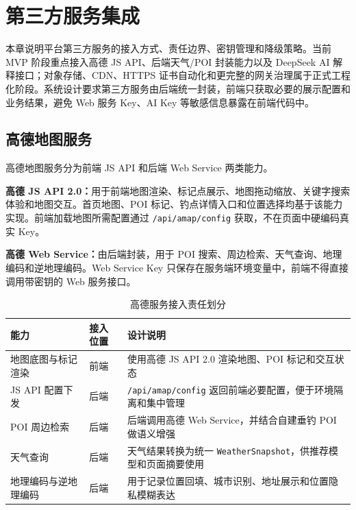 ﻿\section{第三方服务集成}

本章说明平台第三方服务的接入方式、责任边界、密钥管理和降级策略。当前 MVP 阶段重点接入高德 JS API、后端天气/POI 封装能力以及 DeepSeek AI 解释接口；对象存储、CDN、HTTPS 证书自动化和更完整的网关治理属于正式工程化阶段。系统设计要求第三方服务由后端统一封装，前端只获取必要的展示配置和业务结果，避免 Web 服务 Key、AI Key 等敏感信息暴露在前端代码中。

\subsection{高德地图服务}

高德地图服务分为前端 JS API 和后端 Web Service 两类能力。

\textbf{高德 JS API 2.0：}用于前端地图渲染、标记点展示、地图拖动缩放、关键字搜索体验和地图交互。首页地图、POI 标记、钓点详情入口和位置选择均基于该能力实现。前端加载地图所需配置通过 \texttt{/api/amap/config} 获取，不在页面中硬编码真实 Key。

\textbf{高德 Web Service：}由后端封装，用于 POI 搜索、周边检索、天气查询、地理编码和逆地理编码。Web Service Key 只保存在服务端环境变量中，前端不得直接调用带密钥的 Web 服务接口。

\begin{table}[H]
  \centering
  \caption{高德服务接入责任划分}
  \label{tab:amap-integration}
  \begin{tabularx}{\textwidth}{p{3cm}|p{4cm}|X}
    \toprule
    \textbf{能力} & \textbf{接入位置} & \textbf{设计说明} \\
    \midrule
    地图底图与标记渲染 & 前端 & 使用高德 JS API 2.0 渲染地图、POI 标记和交互状态 \\
    \hline
    JS API 配置下发 & 后端 & \texttt{/api/amap/config} 返回前端必要配置，便于环境隔离和集中管理 \\
    \hline
    POI 周边检索 & 后端 & 后端调用高德 Web Service，并结合自建垂钓 POI 做语义增强 \\
    \hline
    天气查询 & 后端 & 天气结果转换为统一 \texttt{WeatherSnapshot}，供推荐模型和页面摘要使用 \\
    \hline
    地理编码与逆地理编码 & 后端 & 用于记录位置回填、城市识别、地址展示和位置隐私模糊表达 \\
    \bottomrule
  \end{tabularx}
\end{table}

